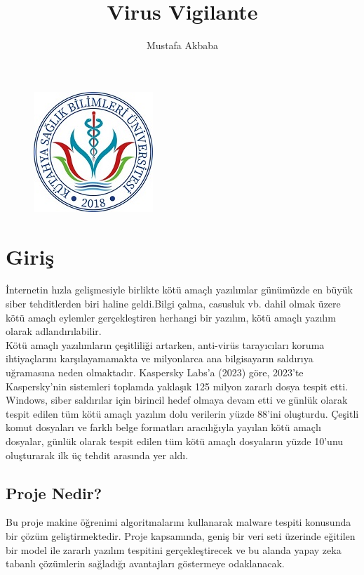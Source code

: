 \documentclass[12pt, a4paper]{article}
\title{Virus Vigilante}
\author{Mustafa Akbaba}
\begin{document}
	\begin{figure}
	   		
	   		\centering
	   		
		   	\includegraphics{logo-1.jpg}
	   	\end{figure}




\maketitle





\section{Giriş}
İnternetin hızla gelişmesiyle birlikte kötü amaçlı yazılımlar günümüzde en büyük  siber tehditlerden biri haline geldi.Bilgi çalma, casusluk vb. dahil olmak üzere kötü amaçlı eylemler gerçekleştiren herhangi bir yazılım, kötü amaçlı yazılım olarak adlandırılabilir. \\
Kötü amaçlı yazılımların çeşitliliği artarken, anti-virüs tarayıcıları koruma ihtiyaçlarını karşılayamamakta ve milyonlarca ana bilgisayarın saldırıya uğramasına neden olmaktadır. Kaspersky Labs'a (2023) göre\cite{kasper}, 2023'te Kaspersky'nin sistemleri toplamda yaklaşık 125 milyon zararlı dosya tespit etti. Windows, siber saldırılar için birincil hedef olmaya devam etti ve günlük olarak tespit edilen tüm kötü amaçlı yazılım dolu verilerin yüzde 88'ini oluşturdu. Çeşitli komut dosyaları ve farklı belge formatları aracılığıyla yayılan kötü amaçlı dosyalar, günlük olarak tespit edilen tüm kötü amaçlı dosyaların yüzde 10'unu oluşturarak ilk üç tehdit arasında yer aldı.


\subsection{Proje Nedir?}
	Bu proje makine öğrenimi algoritmalarını kullanarak malware tespiti konusunda  bir çözüm geliştirmektedir. Proje kapsamında, geniş bir  veri seti üzerinde eğitilen bir model ile zararlı yazılım tespitini gerçekleştirecek ve bu alanda yapay zeka tabanlı çözümlerin sağladığı avantajları göstermeye odaklanacak.
\end{document}
